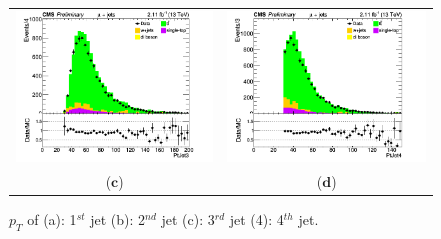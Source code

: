 \documentclass{cmspaper}
\begin{document}
\begin{figure}[htp]
\begin{tabular}{cc}
\includegraphics[scale=0.40]{results/PtJet3.png}
& \hspace{-0.5cm} \includegraphics[scale=0.40]{results/PtJet4.png}\\
   ($\mathbf{c}$)\qquad\qquad&($\mathbf{d}$)\qquad\qquad\qquad\\
\end{tabular}
\caption{$p_{T}$ of (a): 1$^{st}$ jet (b): 2$^{nd}$ jet (c): 3$^{rd}$ jet (4): 4$^{th}$ jet.}\label{Pts_jets}
\end{figure}
\end{document}
